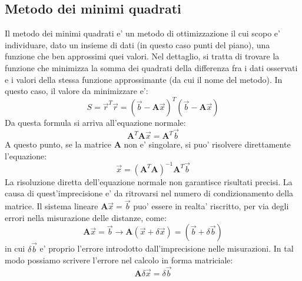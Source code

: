 \documentclass[Lau,binding=0.6cm]{sapthesis}
\begin{document}
\subsection{Metodo dei minimi quadrati}
Il metodo dei minimi quadrati e' un metodo di ottimizzazione il cui scopo e' individuare, dato un insieme di dati (in questo caso punti del piano), una funzione che ben approssimi quei valori. Nel dettaglio, si tratta di trovare la funzione che minimizza la somma dei quadrati della differenza fra i dati osservati e i valori della  stessa funzione approssimante (da cui il nome del metodo).\newline
In questo caso, il valore da minimizzare e': \newline
\begin{equation}
S = \overrightarrow{r}^T\overrightarrow{r} = (\overrightarrow{b}-\textbf{A}\overrightarrow{x})^T(\overrightarrow{b}-\textbf{A}\overrightarrow{x})
\end{equation}
\newline
Da questa formula si arriva all'equazione normale:\newline
\begin{equation}
\textbf{A}^T\textbf{A}\overrightarrow{x} = \textbf{A}^T\overrightarrow{b}
\end{equation}
\newline
A questo punto, se la matrice $\textbf{A}$ non e' singolare, si puo' risolvere direttamente l'equazione:\newline
\[\overrightarrow{x} = (\textbf{A}^T\textbf{A})^{-1}\textbf{A}^T\overrightarrow{b}\]
La risoluzione diretta dell'equazione normale non garantisce risultati precisi. La causa di quest'imprecisione e' da ritrovarsi nel numero di condizionamento della matrice. Il sistema lineare $\textbf{A}\overrightarrow{x} = \overrightarrow{b}$ puo' essere in realta' riscritto, per via degli errori nella misurazione delle distanze, come: \newline
\begin{equation}
\textbf{A}\overrightarrow{x} = \overrightarrow{b} \rightarrow \textbf{A}(\overrightarrow{x}+\delta\overrightarrow{x}) = (\overrightarrow{b}+\delta\overrightarrow{b})
\end{equation}
\newline
in cui $\delta\overrightarrow{b}$ e' proprio l'errore introdotto dall'imprecisione nelle misurazioni.
In tal modo possiamo scrivere l'errore nel calcolo in forma matriciale:\newline
\begin{equation}
\textbf{A}\delta\overrightarrow{x} = \delta\overrightarrow{b}
\end{equation}
\end{document}
